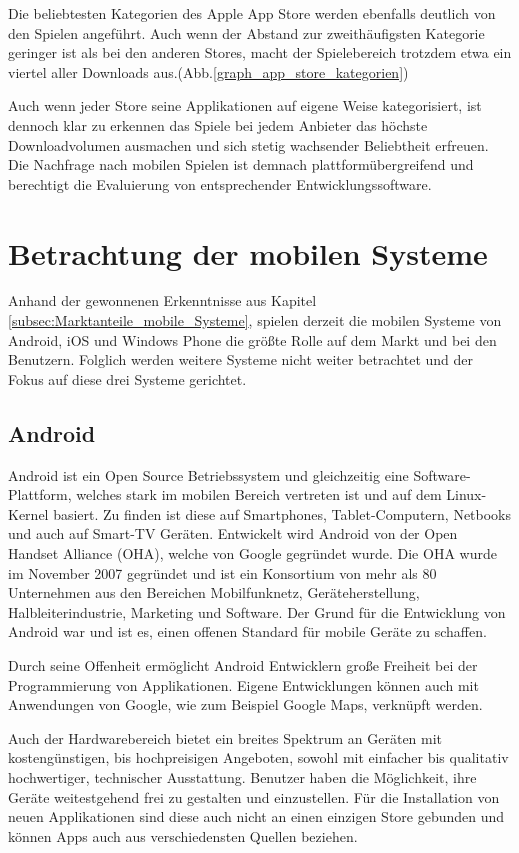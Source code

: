 Die beliebtesten Kategorien des Apple App Store werden ebenfalls deutlich von den Spielen angeführt. Auch wenn der Abstand zur zweithäufigsten Kategorie geringer ist als bei den anderen Stores, macht der Spielebereich trotzdem etwa ein viertel aller Downloads aus.(Abb.\ref{graph_app_store_kategorien})
\medskip

Auch wenn jeder Store seine Applikationen auf eigene Weise kategorisiert, ist dennoch klar zu erkennen das Spiele bei jedem Anbieter das höchste Downloadvolumen ausmachen und sich stetig wachsender Beliebtheit erfreuen. Die Nachfrage nach mobilen Spielen ist demnach plattformübergreifend und berechtigt die Evaluierung von entsprechender Entwicklungssoftware.

\section{Betrachtung der mobilen Systeme}
Anhand der gewonnenen Erkenntnisse aus Kapitel \ref{subsec:Marktanteile_mobile_Systeme}, spielen derzeit die mobilen Systeme von Android, iOS und Windows Phone die größte Rolle auf dem Markt und bei den Benutzern. Folglich werden weitere Systeme nicht weiter betrachtet und der Fokus auf diese drei Systeme gerichtet.

\subsection{Android}
Android ist ein Open Source Betriebssystem und gleichzeitig eine Software-Plattform, welches stark im mobilen Bereich vertreten ist und auf dem Linux-Kernel basiert. Zu finden ist diese auf Smartphones, Tablet-Computern, Netbooks und auch auf Smart-TV Geräten. \citep{android_overview} Entwickelt wird Android von der Open Handset Alliance (OHA), welche von Google gegründet wurde. Die OHA wurde im November 2007 gegründet und ist ein Konsortium von mehr als 80 Unternehmen aus den Bereichen Mobilfunknetz, Geräteherstellung, Halbleiterindustrie, Marketing und Software. \citep{alliance_members} Der Grund für die Entwicklung von Android war und ist es, einen offenen Standard für mobile Geräte zu schaffen. \citep{alliance_overview}

Durch seine Offenheit ermöglicht Android Entwicklern große Freiheit bei der Programmierung von Applikationen. Eigene Entwicklungen können auch mit Anwendungen von Google, wie zum Beispiel Google Maps, verknüpft werden.

Auch der Hardwarebereich bietet ein breites Spektrum an Geräten mit kostengünstigen, bis hochpreisigen Angeboten, sowohl mit einfacher bis qualitativ hochwertiger, technischer Ausstattung. Benutzer haben die Möglichkeit, ihre Geräte weitestgehend frei zu gestalten und einzustellen. Für die Installation von neuen Applikationen sind diese auch nicht an einen einzigen Store gebunden und können Apps auch aus verschiedensten Quellen beziehen.
\\

